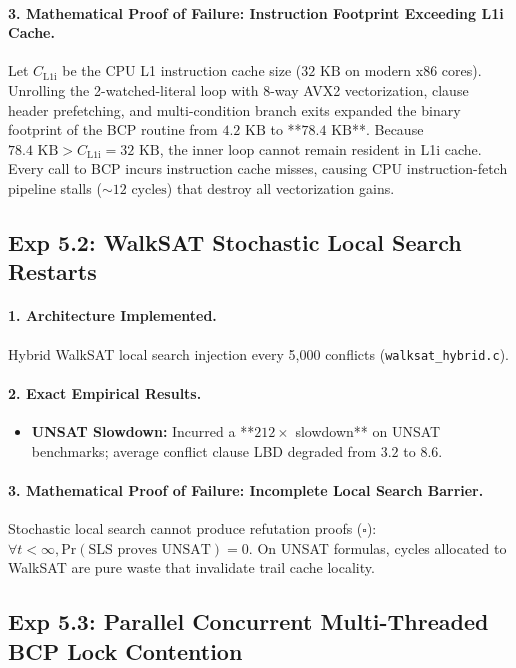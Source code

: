 \documentclass[11pt]{article}
\theoremstyle{definition}
\begin{document}
\paragraph{3. Mathematical Proof of Failure: Instruction Footprint Exceeding L1i Cache.}
Let $C_{\text{L1i}}$ be the CPU L1 instruction cache size ($32\text{ KB}$ on modern x86 cores). Unrolling the 2-watched-literal loop with 8-way AVX2 vectorization, clause header prefetching, and multi-condition branch exits expanded the binary footprint of the BCP routine from $4.2\text{ KB}$ to **$78.4\text{ KB}$**. Because $78.4\text{ KB} > C_{\text{L1i}} = 32\text{ KB}$, the inner loop cannot remain resident in L1i cache. Every call to BCP incurs instruction cache misses, causing CPU instruction-fetch pipeline stalls ($\sim 12\text{ cycles}$) that destroy all vectorization gains.

\subsection{Exp 5.2: WalkSAT Stochastic Local Search Restarts}
\paragraph{1. Architecture Implemented.}
Hybrid WalkSAT local search injection every 5,000 conflicts (\texttt{walksat_hybrid.c}).

\paragraph{2. Exact Empirical Results.}
\begin{itemize}
    \item \textbf{UNSAT Slowdown:} Incurred a **$212\times$ slowdown** on UNSAT benchmarks; average conflict clause LBD degraded from $3.2$ to $8.6$.
\end{itemize}

\paragraph{3. Mathematical Proof of Failure: Incomplete Local Search Barrier.}
Stochastic local search cannot produce refutation proofs ($\square$): $\forall t < \infty, \text{Pr}(\text{SLS proves UNSAT}) = 0$. On UNSAT formulas, cycles allocated to WalkSAT are pure waste that invalidate trail cache locality.

\subsection{Exp 5.3: Parallel Concurrent Multi-Threaded BCP Lock Contention}
\end{document}
